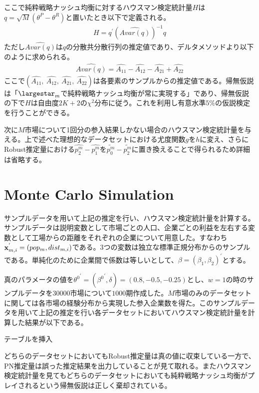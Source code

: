 \documentclass{jsarticle}
\begin{document}
ここで純粋戦略ナッシュ均衡に対するハウスマン検定統計量$H$は$q = \sqrt{M} (\theta^P - \theta^R)$と置いたとき以下で定義される。
\begin{align*}
H = q^{'} \left( \hat{Avar\left( q \right)} \right)^{-1} q
\end{align*}
ただし$\hat{Avar\left( q \right)}$は$q$の分散共分散行列の推定値であり、デルタメソッドより以下のように求められる。
\begin{align*}
	\hat{Avar\left( q \right)} = \hat{A_{11}} - \hat{A_{12}} - \hat{A_{21}} + \hat{A_{22}} 
\end{align*}
ここで$\left(\hat{A_{11}},\ \hat{A_{12}},\ \hat{A_{21}},\ \hat{A_{22}} \right)$は各要素のサンプルからの推定値である。帰無仮説は「$\largestar_m$で純粋戦略ナッシュ均衡が常に実現する」であり、帰無仮説の下で$H$は自由度$2K + 2$の$\chi^2$分布に従う。これを利用し有意水準$5\%$の仮説検定を行うことができる。

次に$M$市場について1回分の参入結果しかない場合のハウスマン検定統計量を与える。上で述べた理想的なデータセットにおける尤度関数$g$を$h$に変え、さらにRobust推定量における$\hat{p_2^m} - \hat{p_1^m}$を$\tilde{p_0^m} - \tilde{p_2^m}$に置き換えることで得られるため詳細は省略する。

\section{Monte Carlo Simulation}
サンプルデータを用いて上記の推定を行い、ハウスマン検定統計量を計算する。サンプルデータは説明変数として市場ごとの人口、企業ごとの利益を左右する変数として工場からの距離をそれぞれの企業について用意した。すなわち${\bf x}_{m, i}^{'} = (pop_m, dist_{m, i})$である。3つの変数は独立な標準正規分布からのサンプルである。単純化のために企業間で係数は等しいとして、$\beta = (\beta_1, \beta_2)^{'}$とする。

真のパラメータの値を${\theta^0}^{'} = ({\beta^0}^{'}, \delta) = (0.8, -0.5, -0.25)$とし、$w = 1$の時のサンプルデータを$30000$市場について$1000$期作成した。$M$市場のみのデータセットに関しては各市場の経験分布から実現した参入企業数を得た。このサンプルデータを用いて上記の推定を行い各データセットにおいてハウスマン検定統計量を計算した結果が以下である。

テーブルを挿入

どちらのデータセットにおいてもRobust推定量は真の値に収束している一方で、PN推定量は誤った推定結果を出力していることが見て取れる。またハウスマン検定統計量を見てもどちらのデータセットにおいても純粋戦略ナッシュ均衡がプレイされるという帰無仮説は正しく棄却されている。
\end{document}
